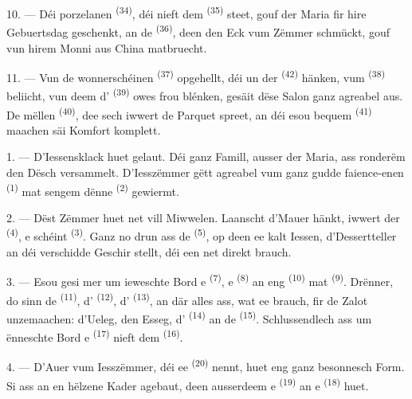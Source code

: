 10. --- Déi porzelanen  \textsuperscript{(34)}, déi nieft dem
 \textsuperscript{(35)} steet, gouf der Maria fir hire
Gebuertsdag geschenkt, an de  \textsuperscript{(36)}, deen den Eck
vum Zëmmer schmückt, gouf vun hirem Monni aus China matbruecht.

11. --- Vun de wonnerschéinen  \textsuperscript{(37)} opgehellt, déi un
der  \textsuperscript{(42)} hänken, vum 
\textsuperscript{(38)} beliicht, vun deem d'
\textsuperscript{(39)} owes frou blénken, gesäit dëse Salon ganz agreabel aus. De
mëllen  \textsuperscript{(40)}, dee sech iwwert de Parquet spreet, an
déi esou bequem  \textsuperscript{(41)} maachen säi
Komfort komplett.

\VUsaut{3.6mm}
\VUsaut{3.0mm}

1. --- D'Iessensklack huet gelaut. Déi ganz Famill, ausser der Maria, ass ronderëm
den Dësch versammelt. D'Iesszëmmer gëtt agreabel vum ganz gudde faience-enen
 \textsuperscript{(1)} mat sengem dënne 
\textsuperscript{(2)} gewiermt.

2. --- Dëst Zëmmer huet net vill Miwwelen. Laanscht d'Mauer hänkt, iwwert der
 \textsuperscript{(4)}, e schéint 
\textsuperscript{(3)}. Ganz no drun ass de  \textsuperscript{(5)}, op
deen ee kalt Iessen, d'Dessertteller an déi verschidde Geschir stellt, déi een net
direkt brauch.

3. --- Esou gesi mer um ieweschte Bord e 
\textsuperscript{(7)}, e  \textsuperscript{(8)} an eng 
\textsuperscript{(10)} mat  \textsuperscript{(9)}. Drënner, do sinn de
 \textsuperscript{(11)}, d' \textsuperscript{(12)}, d'
 \textsuperscript{(13)}, an där alles ass, wat ee brauch, fir de
Zalot unzemaachen: d'Ueleg, den Esseg, d' \textsuperscript{(14)} an de
 \textsuperscript{(15)}. Schlussendlech ass um ënneschte Bord e
 \textsuperscript{(17)} nieft dem 
\textsuperscript{(16)}.

4. --- D'Auer vum Iesszëmmer, déi ee  \textsuperscript{(20)} nennt,
huet eng ganz besonnesch Form. Si ass an en hëlzene Kader agebaut, deen ausserdeem e
 \textsuperscript{(19)} an e 
\textsuperscript{(18)} huet.

